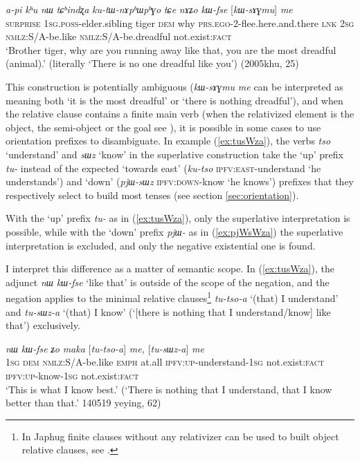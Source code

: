 \documentclass[oneside,a4paper,11pt]{article}
\newcommand{\ipa}[1]{{\phon\textit{#1}}}
\newcommand{\forme}[2]{\ipa{#1} `#2'}
\begin{document}
 \begin{exe}
\ex \label{ex:kWfse.me}
\gll \ipa{ama} 	\ipa{a-pi} 	\ipa{kʰu} 	\ipa{nɯ} 	\ipa{tɕʰindʐa} 	\ipa{ku-tɯ-nɤpʰɯpʰɣo} 	\ipa{tɕe}  \ipa{nɤʑo} 	\ipa{kɯ-fse} 	[\ipa{kɯ-sɤɣmu}] 	\ipa{me} 	\\
\textsc{surprise} \textsc{1sg.poss}-elder.sibling tiger \textsc{dem} why \textsc{prs.ego}-2-flee.here.and.there \textsc{lnk} \textsc{2sg}  \textsc{nmlz}:S/A-be.like   \textsc{nmlz}:S/A-be.dreadful  not.exist:\textsc{fact} \\
\glt `Brother tiger, why are you running away like that, you are the most dreadful (animal).' (literally `There is no one dreadful like you') (2005khu, 25)
\end{exe}

This construction is potentially ambiguous (\ipa{kɯ-sɤɣmu} \ipa{me} can be interpreted as meaning both  `it is the most dreadful' or `there is nothing dreadful'), and when the relative clause contains a finite main verb (when the relativized element is the object, the semi-object or the goal see \citealt{jacques16relatives}), it is possible in some cases to use orientation prefixes to disambiguate. In example (\ref{ex:tusWza}), the verbs \forme{tso}{understand} and \forme{sɯz}{know} in the superlative construction take the `up' prefix \ipa{tu-} instead of the expected `towards east' (\ipa{ku-tso} \textsc{ipfv:east}-understand `he understands') and `down' (\ipa{pjɯ-sɯz} \textsc{ipfv:down}-know `he knows') prefixes that they respectively select to build most tenses (see section \ref{sec:orientation}).

With the `up' prefix \ipa{tu-} as in (\ref{ex:tusWza}), only the superlative interpretation is possible, while with the `down' prefix \ipa{pjɯ-} as in (\ref{ex:pjWsWza}) the superlative interpretation is excluded, and only the negative existential one is found.

I interpret this difference as a matter of semantic scope. In (\ref{ex:tusWza}),  the adjunct \ipa{nɯ} \ipa{kɯ-fse} `like that' is outside of the scope of the negation, and the negation applies to the minimal relative clauses\footnote{In Japhug finite clauses without any relativizer can be used to built object relative clauses, see \citet{jacques16relatives}.} \ipa{tu-tso-a} `(that) I understand' and \ipa{tu-sɯz-a} `(that) I know' (`[there is nothing that I understand/know] like that') exclusively.

\begin{exe}
\ex \label{ex:tusWza}
\gll \ipa{aʑo} 	\ipa{nɯ} 	\ipa{kɯ-fse} 	\ipa{ʑo} 	\ipa{maka} [\ipa{tu-tso-a}] 	\ipa{me,} [\ipa{tu-sɯz-a}] 	\ipa{me} \\
\textsc{1sg} \textsc{dem} \textsc{nmlz}:S/A-be.like \textsc{emph} at.all \textsc{ipfv:up}-understand-\textsc{1sg} not.exist:\textsc{fact} \textsc{ipfv:up}-know-\textsc{1sg} not.exist:\textsc{fact} \\
\glt `This is what I know best.' (`There is nothing that I understand, that I know better than that.' 140519 yeying, 62)
\end{exe}
\end{document}
